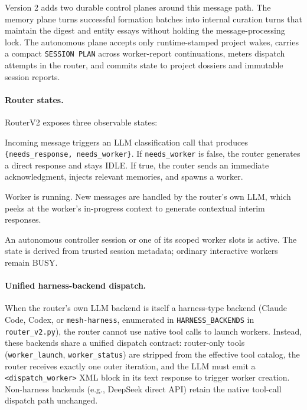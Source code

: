 \documentclass[11pt,letterpaper]{report}
\newcommand{\code}[1]{\texttt{#1}}
\begin{document}
Version 2 adds two durable control planes around this message path. The
memory plane turns successful formation batches into internal curation
turns that maintain the digest and entity essays without holding the
message-processing lock. The autonomous plane accepts only runtime-stamped
project wakes, carries a compact \code{SESSION PLAN} across worker-report
continuations, meters dispatch attempts in the router, and commits state to
project dossiers and immutable session reports.

\paragraph{Router states.}
RouterV2 exposes three observable states:
\begin{description}[nosep, leftmargin=1.5em, labelwidth=1.2em]
  \item[IDLE] Incoming message triggers an LLM classification call that
    produces \code{\{needs\_response, needs\_worker\}}.  If
    \code{needs\_worker} is false, the router generates a direct
    response and stays IDLE.  If true, the router sends an immediate
    acknowledgment, injects relevant memories, and spawns a worker.
  \item[BUSY] Worker is running.  New messages are handled by the
    router's own LLM, which peeks at the worker's in-progress
    context to generate contextual interim responses.
  \item[AUTO] An autonomous controller session or one of its scoped worker
    slots is active. The state is derived from trusted session metadata;
    ordinary interactive workers remain BUSY.
\end{description}

\paragraph{Unified harness-backend dispatch.}
When the router's own LLM backend is itself a harness-type backend
(Claude Code, Codex, or \code{mesh-harness}, enumerated in
\code{HARNESS\_BACKENDS} in \code{router\_v2.py}), the router cannot
use native tool calls to launch workers. Instead, these backends share a
unified dispatch contract: router-only tools (\code{worker\_launch},
\code{worker\_status}) are stripped from the effective tool catalog, the
router receives exactly one outer iteration, and the LLM must emit a
\code{<dispatch\_worker>} XML block in its text response to trigger
worker creation. Non-harness backends (e.g., DeepSeek direct API)
retain the native tool-call dispatch path unchanged.
\end{document}
